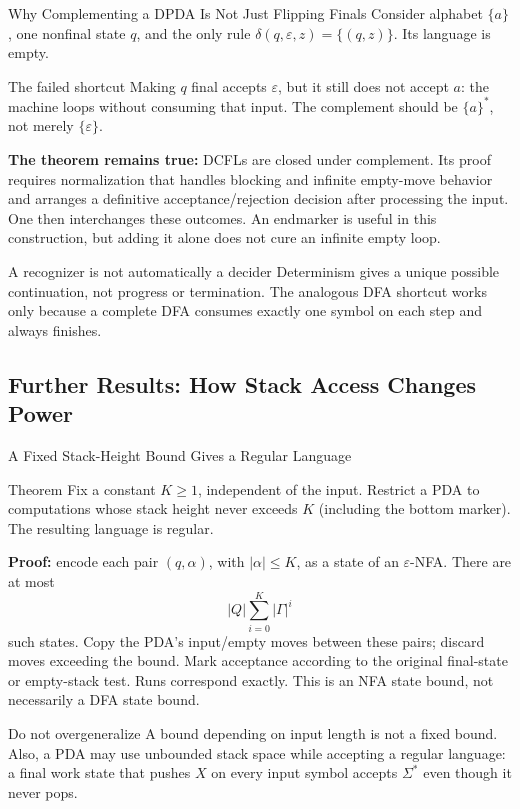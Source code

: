 \documentclass[10pt]{beamer}
\begin{document}
\begin{frame}{Why Complementing a DPDA Is Not Just Flipping Finals}
  \small
  Consider alphabet $\{a\}$, one nonfinal state $q$, and the only rule
  $\delta(q,\varepsilon,z)=\{(q,z)\}$. Its language is empty.
  \begin{block}{The failed shortcut}
    Making $q$ final accepts $\varepsilon$, but it still does not accept
    $a$: the machine loops without consuming that input. The complement
    should be $\{a\}^*$, not merely $\{\varepsilon\}$.
  \end{block}
  \pause
  \textbf{The theorem remains true:} DCFLs are closed under complement.
  Its proof requires normalization that handles blocking and infinite
  empty-move behavior and arranges a definitive acceptance/rejection
  decision after processing the input. One then interchanges these outcomes.
  An endmarker is useful in this construction, but adding it alone does
  not cure an infinite empty loop.
  \pause
  \begin{alertblock}{A recognizer is not automatically a decider}
    Determinism gives a unique possible continuation, not progress or
    termination. The analogous DFA shortcut works only because a complete
    DFA consumes exactly one symbol on each step and always finishes.
  \end{alertblock}
\end{frame}

\subsection{Further Results: How Stack Access Changes Power}

\begin{frame}{A Fixed Stack-Height Bound Gives a Regular Language}
  \small
  \begin{block}{Theorem}
    Fix a constant $K\ge1$, independent of the input. Restrict a PDA to
    computations whose stack height never exceeds $K$ (including the
    bottom marker). The resulting language is regular.
  \end{block}
  \pause
  \textbf{Proof:} encode each pair $(q,\alpha)$, with $|\alpha|\le K$,
  as a state of an $\varepsilon$-NFA. There are at most
  \[
    |Q|\sum_{i=0}^{K}|\Gamma|^i
  \]
  such states. Copy the PDA's input/empty moves between these pairs;
  discard moves exceeding the bound. Mark acceptance according to the
  original final-state or empty-stack test. Runs correspond exactly.
  This is an NFA state bound, not necessarily a DFA state bound.
  \pause
  \begin{alertblock}{Do not overgeneralize}
    A bound depending on input length is not a fixed bound. Also, a PDA
    may use unbounded stack space while accepting a regular language:
    a final work state that pushes $X$ on every input symbol accepts
    $\Sigma^*$ even though it never pops.
  \end{alertblock}
\end{frame}
\end{document}
